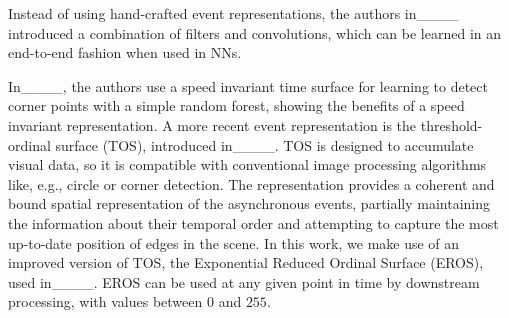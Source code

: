 Instead of using hand-crafted event representations, the authors in____ introduced a combination of filters and convolutions, which can be learned in an end-to-end fashion when used in \acp{NN}.

In____, the authors use a speed invariant time surface for learning to detect corner points with a simple random forest, showing the benefits of a speed invariant representation.
%
A more recent event representation is the threshold-ordinal surface (TOS), introduced in____.
%
TOS is designed to accumulate visual data, so it is compatible with conventional image processing algorithms like, e.g., circle or corner detection.
%
The representation provides a coherent and bound spatial representation of the asynchronous events, partially maintaining the information about their temporal order and attempting to capture the most up-to-date position of edges in the scene.
%
In this work, we make use of an improved version of TOS, the Exponential Reduced Ordinal Surface (EROS), used in____.
%
EROS can be used at any given point in time by downstream processing, with values between $0$ and $255$.